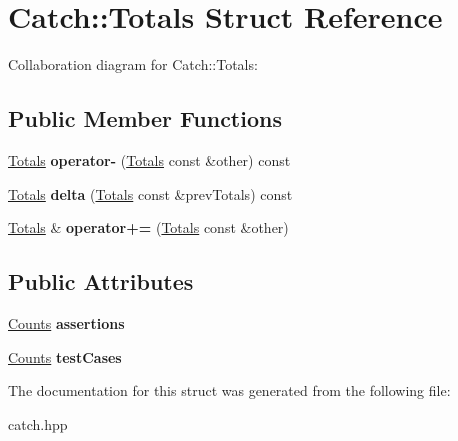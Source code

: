 \hypertarget{struct_catch_1_1_totals}{}\section{Catch\+:\+:Totals Struct Reference}
\label{struct_catch_1_1_totals}


Collaboration diagram for Catch\+:\+:Totals\+:
\subsection*{Public Member Functions}
\begin{DoxyCompactItemize}
\item 
\mbox{\label{struct_catch_1_1_totals_a9279ed39139cb7e7b291918a6d08290e}} 
\hyperlink{struct_catch_1_1_totals}{Totals} {\bfseries operator-\/} (\hyperlink{struct_catch_1_1_totals}{Totals} const \&other) const
\item 
\mbox{\label{struct_catch_1_1_totals_a1a94a654f5f3786b75695e081fc9bca2}} 
\hyperlink{struct_catch_1_1_totals}{Totals} {\bfseries delta} (\hyperlink{struct_catch_1_1_totals}{Totals} const \&prev\+Totals) const
\item 
\mbox{\label{struct_catch_1_1_totals_a574015076e54cc405c70b053e3356e43}} 
\hyperlink{struct_catch_1_1_totals}{Totals} \& {\bfseries operator+=} (\hyperlink{struct_catch_1_1_totals}{Totals} const \&other)
\end{DoxyCompactItemize}
\subsection*{Public Attributes}
\begin{DoxyCompactItemize}
\item 
\mbox{\label{struct_catch_1_1_totals_a885ded66df752147b30c3d45aa602ec9}} 
\hyperlink{struct_catch_1_1_counts}{Counts} {\bfseries assertions}
\item 
\mbox{\label{struct_catch_1_1_totals_adb195fe477aedee2ecea88c888f16506}} 
\hyperlink{struct_catch_1_1_counts}{Counts} {\bfseries test\+Cases}
\end{DoxyCompactItemize}


The documentation for this struct was generated from the following file\+:\begin{DoxyCompactItemize}
\item 
catch.\+hpp\end{DoxyCompactItemize}

